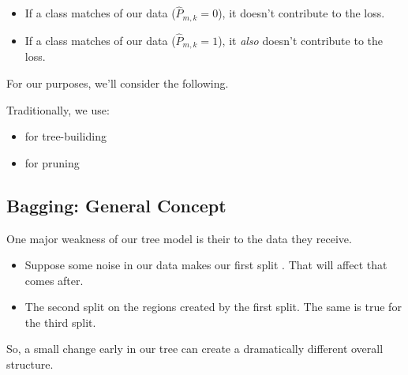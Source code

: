         \begin{itemize}
            \item If a class matches  of our data ($\widehat{P}_{m,k}=0$), it doesn't contribute to the loss.
            \item If a class matches  of our data ($\widehat{P}_{m,k}=1$), it \textit{also} doesn't contribute to the loss.
        \end{itemize}

        For our purposes, we'll consider the following.\\

        \begin{concept}
            Traditionally, we use:

            \begin{itemize}
                \item {} for tree-builiding
                \item {} for pruning
            \end{itemize}
        \end{concept}





    \pagebreak

    \subsection{Bagging: General Concept}

        One major weakness of our tree model is their  to the data they receive.

        \begin{itemize}
            \item Suppose some noise in our data makes our first split . That will affect  that comes after. 
            \item The second split  on the regions created by the first split. The same is true for the third split.
        \end{itemize}

        So, a small change early in our tree can create a dramatically different overall structure.\\

